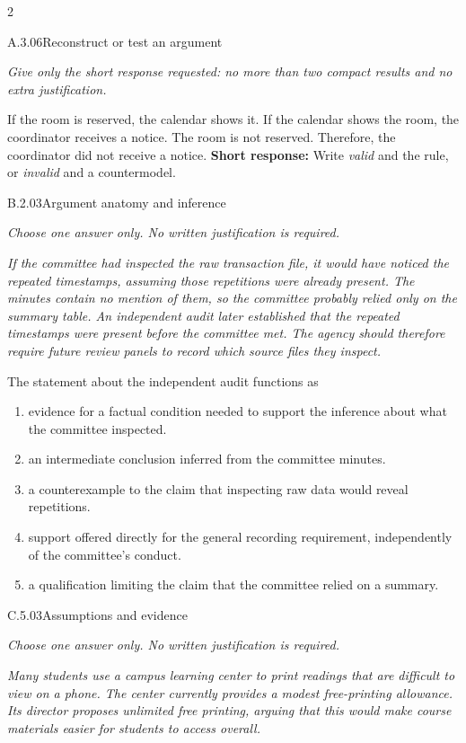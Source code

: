 \documentclass[9pt]{extarticle}
\newcommand{\choice}[1]{\item #1}
\begin{document}
\CoreWorkArea
\FormBreak
{}
\begin{multicols}{2}
\begin{DenseCoreProblem}{A.3.06}{Reconstruct or test an argument}
{\scriptsize\textit{Give only the short response requested: no more than two compact results and no extra justification.}\par}
If the room is reserved, the calendar shows it. If the calendar shows the room, the coordinator receives a notice. The room is not reserved. Therefore, the coordinator did not receive a notice.
\textbf{Short response:} Write \emph{valid} and the rule, or \emph{invalid} and a countermodel.
\end{DenseCoreProblem}
\begin{DenseCoreProblem}{B.2.03}{Argument anatomy and inference}
{\scriptsize\textit{Choose one answer only. No written justification is required.}\par}
\emph{If the committee had inspected the raw transaction file, it would have noticed the repeated timestamps, assuming those repetitions were already present. The minutes contain no mention of them, so the committee probably relied only on the summary table. An independent audit later established that the repeated timestamps were present before the committee met. The agency should therefore require future review panels to record which source files they inspect.}

The statement about the independent audit functions as
\begin{enumerate}[label=(\alph*)]
  \choice{evidence for a factual condition needed to support the inference about what the committee inspected.}
  \choice{an intermediate conclusion inferred from the committee minutes.}
  \choice{a counterexample to the claim that inspecting raw data would reveal repetitions.}
  \choice{support offered directly for the general recording requirement, independently of the committee's conduct.}
  \choice{a qualification limiting the claim that the committee relied on a summary.}
\end{enumerate}
\end{DenseCoreProblem}
\columnbreak
\begin{DenseCoreProblem}{C.5.03}{Assumptions and evidence}
{\scriptsize\textit{Choose one answer only. No written justification is required.}\par}
\emph{Many students use a campus learning center to print readings that are difficult to view on a phone. The center currently provides a modest free-printing allowance. Its director proposes unlimited free printing, arguing that this would make course materials easier for students to access overall.}


\end{DenseCoreProblem}
\end{multicols}
\end{document}
